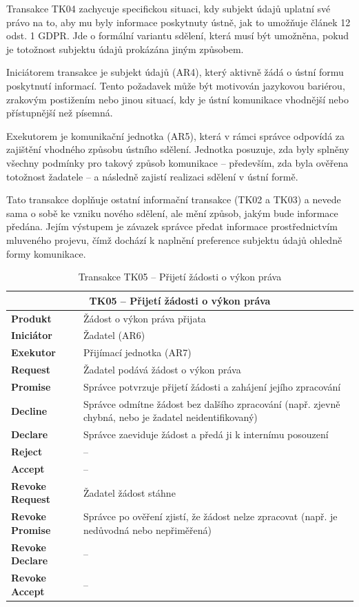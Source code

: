 \begin{itemize}
  Transakce TK04 zachycuje specifickou situaci, kdy subjekt údajů uplatní své právo na to, aby mu byly informace poskytnuty ústně, jak to umožňuje článek 12 odst. 1 GDPR. Jde o formální variantu sdělení, která musí být umožněna, pokud je totožnost subjektu údajů prokázána jiným způsobem.

  Iniciátorem transakce je subjekt údajů (AR4), který aktivně žádá o ústní formu poskytnutí informací. Tento požadavek může být motivován jazykovou bariérou, zrakovým postižením nebo jinou situací, kdy je ústní komunikace vhodnější nebo přístupnější než písemná.

  Exekutorem je komunikační jednotka (AR5), která v rámci správce odpovídá za zajištění vhodného způsobu ústního sdělení. Jednotka posuzuje, zda byly splněny všechny podmínky pro takový způsob komunikace – především, zda byla ověřena totožnost žadatele – a následně zajistí realizaci sdělení v ústní formě.

  Tato transakce doplňuje ostatní informační transakce (TK02 a TK03) a nevede sama o sobě ke vzniku nového sdělení, ale mění způsob, jakým bude informace předána. Jejím výstupem je závazek správce předat informace prostřednictvím mluveného projevu, čímž dochází k naplnění preference subjektu údajů ohledně formy komunikace.

  \begin{table}[H]
    \centering
    \renewcommand{\arraystretch}{1.2}
    \begin{tabular}{|p{3.1cm}|p{9.9cm}|}
    \hline
    \multicolumn{2}{|c|}{\textbf{TK05 – Přijetí žádosti o výkon práva}} \\
    \hline
    \textbf{Produkt} & Žádost o výkon práva přijata \\
    \hline
    \textbf{Iniciátor} & Žadatel (AR6) \\
    \hline
    \textbf{Exekutor} & Přijímací jednotka (AR7) \\
    \hline
    \textbf{Request} & Žadatel podává žádost o výkon práva \\
    \hline
    \textbf{Promise} & Správce potvrzuje přijetí žádosti a zahájení jejího zpracování \\
    \hline
    \textbf{Decline} & Správce odmítne žádost bez dalšího zpracování (např. zjevně chybná, nebo je žadatel neidentifikovaný) \\
    \hline
    \textbf{Declare} & Správce zaeviduje žádost a předá ji k internímu posouzení \\
    \hline
    \textbf{Reject} & – \\
    \hline
    \textbf{Accept} & – \\
    \hline
    \textbf{Revoke Request} & Žadatel žádost stáhne \\
    \hline
    \textbf{Revoke Promise} & Správce po ověření zjistí, že žádost nelze zpracovat (např. je nedůvodná nebo nepřiměřená) \\
    \hline
    \textbf{Revoke Declare} & – \\
    \hline
    \textbf{Revoke Accept} & – \\
    \hline
    \end{tabular}
    \caption{Transakce TK05 – Přijetí žádosti o výkon práva}
  \end{table}


\end{itemize}
